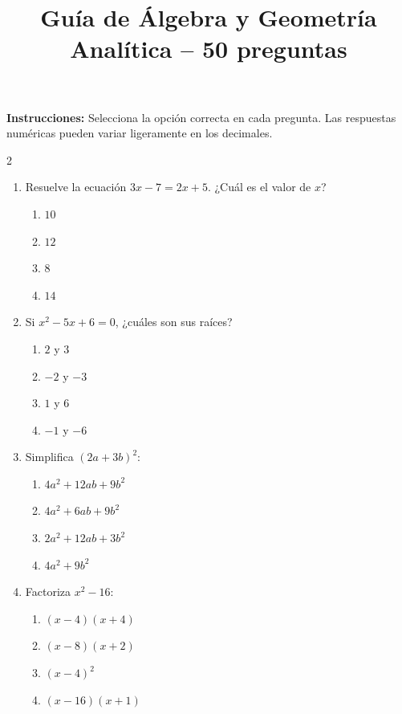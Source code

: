 \documentclass[10pt]{article}
\title{\textbf{Guía de Álgebra y Geometría Analítica -- 50 preguntas}}
\author{}
\date{}
\begin{document}
\maketitle

\noindent
\textbf{Instrucciones:} Selecciona la opción correcta en cada pregunta. Las respuestas numéricas pueden variar ligeramente en los decimales.

\begin{multicols}{2}
\raggedcolumns

\begin{enumerate}


\item Resuelve la ecuación $3x - 7 = 2x + 5$. ¿Cuál es el valor de $x$?
\begin{enumerate}[label=(\alph*)]
\item $10$
\item $12$
\item $8$
\item $14$
\end{enumerate}

\item Si $x^2 - 5x + 6 = 0$, ¿cuáles son sus raíces?
\begin{enumerate}[label=(\alph*)]
\item $2$ y $3$
\item $-2$ y $-3$
\item $1$ y $6$
\item $-1$ y $-6$
\end{enumerate}

\item Simplifica $(2a+3b)^2$:
\begin{enumerate}[label=(\alph*)]
\item $4a^2+12ab+9b^2$
\item $4a^2+6ab+9b^2$
\item $2a^2+12ab+3b^2$
\item $4a^2+9b^2$
\end{enumerate}

\item Factoriza $x^2 - 16$:
\begin{enumerate}[label=(\alph*)]
\item $(x-4)(x+4)$
\item $(x-8)(x+2)$
\item $(x-4)^2$
\item $(x-16)(x+1)$
\end{enumerate}


\end{enumerate}
\end{multicols}
\end{document}
